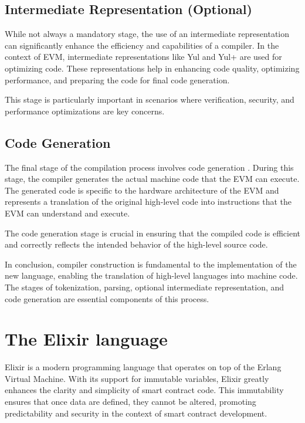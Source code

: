 \subsection{Intermediate Representation (Optional)}

While not always a mandatory stage, the use of an intermediate representation can significantly enhance the efficiency and capabilities of a compiler. In the context of EVM, intermediate representations like Yul and Yul+ are used for optimizing code. These representations help in enhancing code quality, optimizing performance, and preparing the code for final code generation.

This stage is particularly important in scenarios where verification, security, and performance optimizations are key concerns.

\subsection{Code Generation}

The final stage of the compilation process involves code generation \cite[253-281]{CompilerConstruction}. During this stage, the compiler generates the actual machine code that the EVM can execute. The generated code is specific to the hardware architecture of the EVM and represents a translation of the original high-level code into instructions that the EVM can understand and execute.

The code generation stage is crucial in ensuring that the compiled code is efficient and correctly reflects the intended behavior of the high-level source code.


In conclusion, compiler construction is fundamental to the implementation of the new language, enabling the translation of high-level languages into machine code. The stages of tokenization, parsing, optional intermediate representation, and code generation are essential components of this process.

\section{The Elixir language \cite{ElixirOfficialWebSite}}
\label{sec:ex}

Elixir is a modern programming language that operates on top of the Erlang Virtual Machine. With its support for immutable variables, Elixir greatly enhances the clarity and simplicity of smart contract code. This immutability ensures that once data are defined, they cannot be altered, promoting predictability and security in the context of smart contract development.


